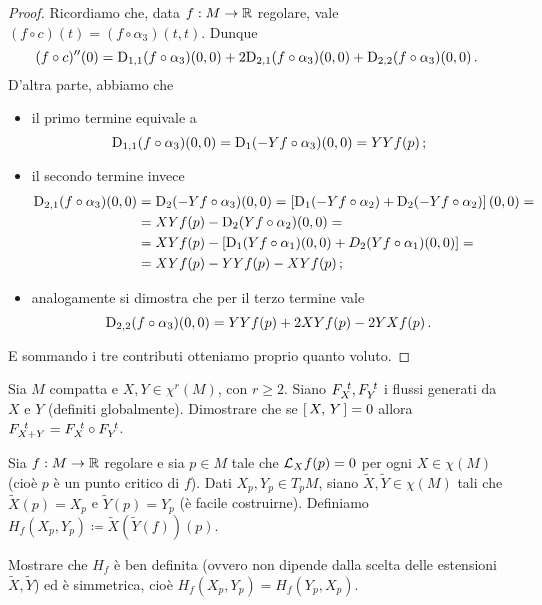 \begin{proof}
	Ricordiamo che, data $f:M\to\mathbb R$ regolare, vale $(f\circ c)(t)=(f\circ\alpha_3)(t,t)$. Dunque 
	\begin{equation*}
		(f\circ c)''(0)=\mathrm D_{1,1}(f\circ\alpha_3)(0,0)+2\mathrm D_{2,1}(f\circ\alpha_3)(0,0)+\mathrm D_{2,2}(f\circ\alpha_3)(0,0)\, \text{. }
	\end{equation*}
	D'altra parte, abbiamo che
	\begin{itemize}
	 \item il primo termine equivale a
	\begin{equation*}
		\mathrm D_{1,1}(f\circ\alpha_3)(0,0)=\mathrm D_1(-Yf\circ\alpha_3)(0,0)=YYf(p)\, \text{; }
	\end{equation*}
	\item il secondo termine invece
	\begin{align*}
		\mathrm D_{2,1}(f\circ\alpha_3)(0,0) &= \mathrm D_2(-Yf\circ\alpha_3)(0,0) = \left[\mathrm D_1(-Yf\circ\alpha_2)+\mathrm D_2(-Yf\circ\alpha_2)\right](0,0)=
		\\ &= XYf(p)-\mathrm D_2(Yf\circ\alpha_2)(0,0)=
		\\ &= XYf(p)-[\mathrm D_1(Yf\circ\alpha_1)(0,0)+D_2(Yf\circ\alpha_1)(0,0)]=
		\\ &= XYf(p)-YYf(p)-XYf(p) \, \text{; }
	\end{align*}
	\item analogamente si dimostra che per il terzo termine vale
	\begin{equation*}
		\mathrm D_{2,2}(f\circ\alpha_3)(0,0)=YYf(p)+2XYf(p)-2YXf(p) \, \text{. }
	\end{equation*}
	\end{itemize}
	E sommando i tre contributi otteniamo proprio quanto voluto.
\end{proof}

\begin{exercise}
	Sia $M$ compatta e $X,Y\in\chi^r(M)$, con $r\ge 2$. Siano $F_{X}^{\ t},F_{Y}^{\ t}$ i flussi generati da $X$ e $Y$ (definiti globalmente). Dimostrare che se $\left[\,X,\,Y\,\right]=0$ allora $F_{X+Y}^{\ t}=F_{X}^{\ t}\circ F_{Y}^{\ t}$.
\end{exercise}

\begin{exercise}
	Sia $f:M\to \mathbb R$ regolare e sia $p\in M$ tale che $\mathcal L_Xf(p)=0$ per ogni $X\in\chi(M)$ (cioè $p$ è un punto critico di $f$). Dati $X_p,Y_p\in T_pM$, siano $\tilde{X},\tilde{Y}\in\chi(M)$ tali che $\tilde{X}(p)=X_p$ e $\tilde{Y}(p)=Y_p$ (è facile costruirne). Definiamo $H_f(X_p,Y_p)\coloneqq\tilde{X}(\tilde{Y}(f))(p)$.
	
	Mostrare che $H_f$ è ben definita (ovvero non dipende dalla scelta delle estensioni $\tilde{X},\tilde{Y}$) ed è simmetrica, cioè $H_f(X_p,Y_p)=H_f(Y_p,X_p)$.
\end{exercise}
